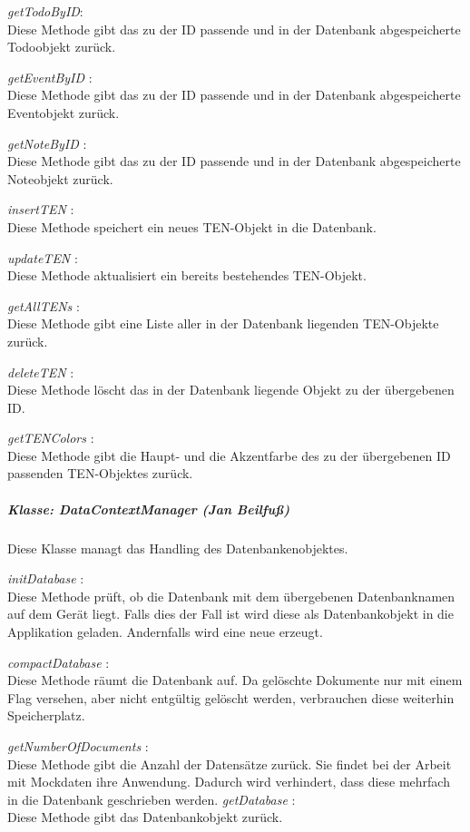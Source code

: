 \textit{ getTodoByID}:\\
Diese Methode gibt das zu der ID passende und in der Datenbank abgespeicherte Todoobjekt zurück. 

\textit{ getEventByID }:\\
Diese Methode gibt das zu der ID passende und in der Datenbank abgespeicherte Eventobjekt zurück. 

\textit{ getNoteByID }:\\
Diese Methode gibt das zu der ID passende und in der Datenbank abgespeicherte Noteobjekt zurück. 

\textit{ insertTEN }:\\
Diese Methode speichert ein neues TEN-Objekt in die Datenbank.

\textit{ updateTEN }:\\
Diese Methode aktualisiert ein bereits bestehendes TEN-Objekt.

\textit{ getAllTENs }:\\
Diese Methode gibt eine Liste aller in der Datenbank liegenden TEN-Objekte zurück.

\textit{ deleteTEN }:\\
Diese Methode löscht das in der Datenbank liegende Objekt zu der übergebenen ID.

\textit{ getTENColors }:\\
Diese Methode gibt die Haupt- und die Akzentfarbe des zu der übergebenen ID passenden TEN-Objektes zurück.

\subparagraph{ Klasse: DataContextManager (Jan Beilfuß)}
Diese Klasse managt das Handling des Datenbankenobjektes.

\textit{ initDatabase }:\\
Diese Methode prüft, ob die Datenbank mit dem übergebenen Datenbanknamen auf dem Gerät liegt. Falls dies der Fall ist wird diese als Datenbankobjekt in die Applikation geladen. Andernfalls wird eine neue erzeugt.

\textit{ compactDatabase }:\\
Diese Methode räumt die Datenbank auf. Da gelöschte Dokumente nur mit einem Flag versehen, aber nicht entgültig gelöscht werden, verbrauchen diese weiterhin Speicherplatz.

\textit{ getNumberOfDocuments }:\\
Diese Methode gibt die Anzahl der Datensätze zurück. Sie findet bei der Arbeit mit Mockdaten ihre Anwendung. Dadurch wird verhindert, dass diese mehrfach in die Datenbank geschrieben werden.
\textit{ getDatabase }:\\
Diese Methode gibt das Datenbankobjekt zurück.

